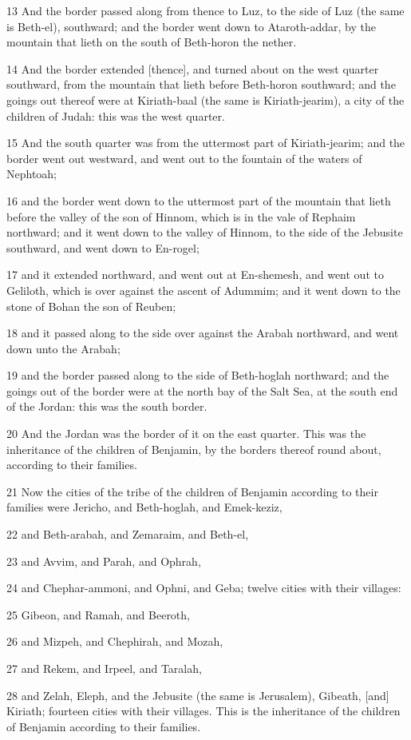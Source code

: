 \par 13 And the border passed along from thence to Luz, to the side of Luz (the same is Beth-el), southward; and the border went down to Ataroth-addar, by the mountain that lieth on the south of Beth-horon the nether.
\par 14 And the border extended [thence], and turned about on the west quarter southward, from the mountain that lieth before Beth-horon southward; and the goings out thereof were at Kiriath-baal (the same is Kiriath-jearim), a city of the children of Judah: this was the west quarter.
\par 15 And the south quarter was from the uttermost part of Kiriath-jearim; and the border went out westward, and went out to the fountain of the waters of Nephtoah;
\par 16 and the border went down to the uttermost part of the mountain that lieth before the valley of the son of Hinnom, which is in the vale of Rephaim northward; and it went down to the valley of Hinnom, to the side of the Jebusite southward, and went down to En-rogel;
\par 17 and it extended northward, and went out at En-shemesh, and went out to Geliloth, which is over against the ascent of Adummim; and it went down to the stone of Bohan the son of Reuben;
\par 18 and it passed along to the side over against the Arabah northward, and went down unto the Arabah;
\par 19 and the border passed along to the side of Beth-hoglah northward; and the goings out of the border were at the north bay of the Salt Sea, at the south end of the Jordan: this was the south border.
\par 20 And the Jordan was the border of it on the east quarter. This was the inheritance of the children of Benjamin, by the borders thereof round about, according to their families.
\par 21 Now the cities of the tribe of the children of Benjamin according to their families were Jericho, and Beth-hoglah, and Emek-keziz,
\par 22 and Beth-arabah, and Zemaraim, and Beth-el,
\par 23 and Avvim, and Parah, and Ophrah,
\par 24 and Chephar-ammoni, and Ophni, and Geba; twelve cities with their villages:
\par 25 Gibeon, and Ramah, and Beeroth,
\par 26 and Mizpeh, and Chephirah, and Mozah,
\par 27 and Rekem, and Irpeel, and Taralah,
\par 28 and Zelah, Eleph, and the Jebusite (the same is Jerusalem), Gibeath, [and] Kiriath; fourteen cities with their villages. This is the inheritance of the children of Benjamin according to their families.

